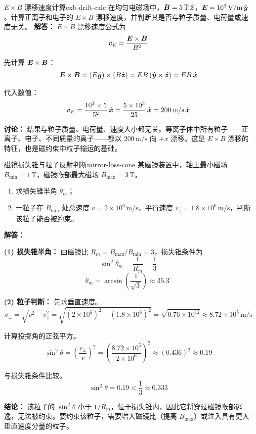\begin{example}{$E\times B$ 漂移速度计算}{exb-drift-calc}
在均匀电磁场中，$\bm{B}=5\,\mathrm{T}\,\hat{\bm{z}}$，$\bm{E}=10^3\,\mathrm{V/m}\,\hat{\bm{y}}$。计算正离子和电子的 $E\times B$ 漂移速度，并判断其是否与粒子质量、电荷量或速度无关。
\tcblower
\textbf{解答：}
$E\times B$ 漂移速度公式为
\[
\bm{v}_E = \frac{\bm{E}\times\bm{B}}{B^2}
\]

先计算 $\bm{E}\times\bm{B}$：
\[
\bm{E}\times\bm{B} = (E\hat{\bm{y}})\times(B\hat{\bm{z}}) = EB\,(\hat{\bm{y}}\times\hat{\bm{z}}) = EB\,\hat{\bm{x}}
\]

代入数值：
\[
\bm{v}_E = \frac{10^3\times 5}{5^2}\,\hat{\bm{x}} = \frac{5\times 10^3}{25}\,\hat{\bm{x}} = 200\,\mathrm{m/s}\,\hat{\bm{x}}
\]

\textbf{讨论：} 结果与粒子质量、电荷量、速度大小都无关。等离子体中所有粒子——正离子、电子、不同质量的离子——都以 $200\,\mathrm{m/s}$ 向 $+x$ 漂移。这是 $E\times B$ 漂移的特征，也是磁约束中粒子输运的基础。
\end{example}

\begin{example}{磁镜损失锥与粒子反射判断}{mirror-loss-cone}
某磁镜装置中，轴上最小磁场 $B_{\min}=1\,\mathrm{T}$，磁镜喉部最大磁场 $B_{\max}=3\,\mathrm{T}$。
\begin{enumerate}[label=(\arabic*)]
\item 求损失锥半角 $\theta_m$；
\item 一粒子在 $B_{\min}$ 处总速度 $v=2\times 10^6\,\mathrm{m/s}$，平行速度 $v_{\parallel}=1.8\times 10^6\,\mathrm{m/s}$，判断该粒子能否被约束。
\end{enumerate}
\tcblower
\textbf{解答：}

\textbf{(1) 损失锥半角：}
由磁镜比 $R_m = B_{\max}/B_{\min}=3$，损失锥条件为
\[
\sin^2\theta_m = \frac{1}{R_m} = \frac{1}{3}
\]
\[
\theta_m = \arcsin\!\left(\frac{1}{\sqrt{3}}\right) \approx 35.3^{\circ}
\]

\textbf{(2) 粒子判断：}
先求垂直速度。
\[
v_{\perp} = \sqrt{v^2 - v_{\parallel}^2} = \sqrt{(2\times 10^6)^2 - (1.8\times 10^6)^2} = \sqrt{0.76\times 10^{12}} \approx 8.72\times 10^{5}\,\mathrm{m/s}
\]

计算投掷角的正弦平方。
\[
\sin^2\theta = \left(\frac{v_{\perp}}{v}\right)^2 = \left(\frac{8.72\times 10^5}{2\times 10^6}\right)^2 \approx (0.436)^2 \approx 0.19
\]

与损失锥条件比较。
\[
\sin^2\theta = 0.19 < \frac{1}{3} \approx 0.333
\]

\textbf{结论：} 该粒子的 $\sin^2\theta$ 小于 $1/R_m$，位于损失锥内，因此它将穿过磁镜喉部逃逸，无法被约束。要约束该粒子，需要增大磁镜比（提高 $B_{\max}$）或注入具有更大垂直速度分量的粒子。
\end{example}

